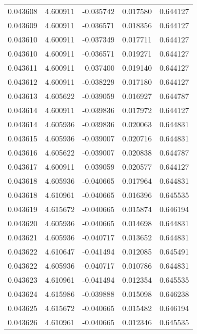 \begin{tabular}{lrrrr}
0.043608    &  4.600911 & -0.035742 &  0.017580 &             0.644127 \\
0.043609    &  4.600911 & -0.036571 &  0.018356 &             0.644127 \\
0.043610    &  4.600911 & -0.037349 &  0.017711 &             0.644127 \\
0.043610    &  4.600911 & -0.036571 &  0.019271 &             0.644127 \\
0.043611    &  4.600911 & -0.037400 &  0.019140 &             0.644127 \\
0.043612    &  4.600911 & -0.038229 &  0.017180 &             0.644127 \\
0.043613    &  4.605622 & -0.039059 &  0.016927 &             0.644787 \\
0.043614    &  4.600911 & -0.039836 &  0.017972 &             0.644127 \\
0.043614    &  4.605936 & -0.039836 &  0.020063 &             0.644831 \\
0.043615    &  4.605936 & -0.039007 &  0.020716 &             0.644831 \\
0.043616    &  4.605622 & -0.039007 &  0.020838 &             0.644787 \\
0.043617    &  4.600911 & -0.039059 &  0.020577 &             0.644127 \\
0.043618    &  4.605936 & -0.040665 &  0.017964 &             0.644831 \\
0.043618    &  4.610961 & -0.040665 &  0.016396 &             0.645535 \\
0.043619    &  4.615672 & -0.040665 &  0.015874 &             0.646194 \\
0.043620    &  4.605936 & -0.040665 &  0.014698 &             0.644831 \\
0.043621    &  4.605936 & -0.040717 &  0.013652 &             0.644831 \\
0.043622    &  4.610647 & -0.041494 &  0.012085 &             0.645491 \\
0.043622    &  4.605936 & -0.040717 &  0.010786 &             0.644831 \\
0.043623    &  4.610961 & -0.041494 &  0.012354 &             0.645535 \\
0.043624    &  4.615986 & -0.039888 &  0.015098 &             0.646238 \\
0.043625    &  4.615672 & -0.040665 &  0.015482 &             0.646194 \\
0.043626    &  4.610961 & -0.040665 &  0.012346 &             0.645535 \\

\end{tabular}
